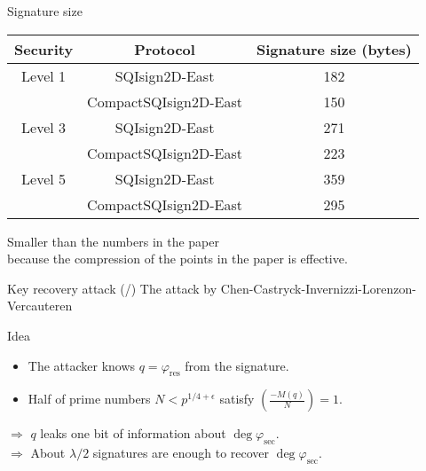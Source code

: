 \documentclass[12pt]{beamer}
\begin{document}
\begin{frame}{Signature size}
    \begin{table}
        \begin{center}
            \begin{tabular}{c|c|c}
                Security & Protocol & Signature size (bytes)\\
                \hline
                Level 1 & SQIsign2D-East & 182\\[3pt]
                 & CompactSQIsign2D-East & 150\\[3pt]
                Level 3 & SQIsign2D-East & 271\\[3pt]
                    & CompactSQIsign2D-East & 223\\[3pt]
                Level 5 & SQIsign2D-East & 359\\[3pt]
                    & CompactSQIsign2D-East & 295\\
            \end{tabular}
        \end{center}
    \end{table}

    \vspace*{10pt}
    Smaller than the numbers in the paper\\
    because the compression of the points in the paper is effective.
\end{frame}

\newcommand*{\attacktotal}{\total{attackcnt}}
\begin{frame}{Key recovery attack (/\attacktotal{})}
    The attack by Chen-Castryck-Invernizzi-Lorenzon-Vercauteren

    \vspace{10pt}
    \begin{itembox}{Idea}
    \begin{itemize}
        \item The attacker knows $q = \varphi_\mathrm{res}$ from the signature.
        \item Half of prime numbers $N < p^{1/4+\epsilon}$ satisfy $\left(\frac{-M(q)}{N}\right) = 1$.
    \end{itemize}
    $\Rightarrow$ $q$ leaks one bit of information about $\deg\varphi_\mathrm{sec}$.\\[5pt]
    $\Rightarrow$ About $\lambda/2$ signatures are enough to recover $\deg\varphi_\mathrm{sec}$.
    \end{itembox}
\end{frame}
\end{document}
